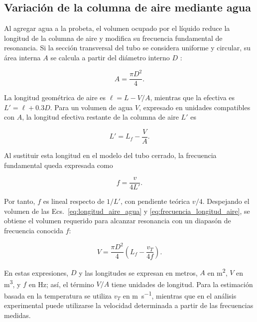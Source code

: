 \subsection{Variación de la columna de aire mediante agua}

Al agregar agua a la probeta, el volumen ocupado por el líquido reduce la longitud de la columna de aire y modifica su frecuencia fundamental de resonancia. Si la sección transversal del tubo se considera uniforme y circular, su área interna $A$ se calcula a partir del diámetro interno $D$ \cite{guiauca}:

\begin{equation}
A=\frac{\pi D^2}{4}.
\label{eq:area_tubo}
\end{equation}

La longitud geométrica de aire es $\ell=L-V/A$, mientras que la efectiva es $L'=\ell+0.3D$. Para un volumen de agua $V$, expresado en unidades compatibles con $A$, la longitud efectiva restante de la columna de aire $L'$ es

\begin{equation}
L'=L_f-\frac{V}{A}.
\label{eq:longitud_aire_agua}
\end{equation}

Al sustituir esta longitud en el modelo del tubo cerrado, la frecuencia fundamental queda expresada como

\begin{equation}
f=\frac{v}{4L'}.
\label{eq:frecuencia_longitud_aire}
\end{equation}

Por tanto, $f$ es lineal respecto de $1/L'$, con pendiente teórica $v/4$. Despejando el volumen de las Ecs.~\eqref{eq:longitud_aire_agua} y \eqref{eq:frecuencia_longitud_aire}, se obtiene el volumen requerido para alcanzar resonancia con un diapasón de frecuencia conocida $f$:

\begin{equation}
V=\frac{\pi D^2}{4}\left(L_f-\frac{v_T}{4f}\right).
\label{eq:volumen_resonancia}
\end{equation}

En estas expresiones, $D$ y las longitudes se expresan en metros, $A$ en \si{\meter\squared}, $V$ en \si{\meter\cubed}, y $f$ en \si{\hertz}; así, el término $V/A$ tiene unidades de longitud. Para la estimación basada en la temperatura se utiliza $v_T$ en \si{\meter\per\second}, mientras que en el análisis experimental puede utilizarse la velocidad determinada a partir de las frecuencias medidas.

